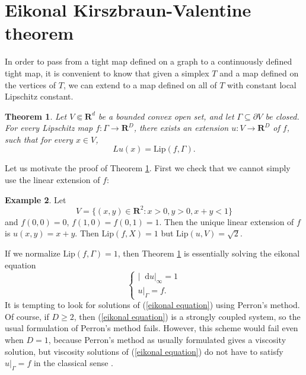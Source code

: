 \documentclass[reqno,11pt]{amsart}
\newcommand{\RR}{\mathbf{R}}
\newcommand*\dif{\mathop{}\!\mathrm{d}}
\DeclareMathOperator{\dist}{dist}
\newcommand{\Lip}{\mathrm{Lip}}
\newtheorem{theorem}{Theorem}[section]
\theoremstyle{definition}
\newtheorem{example}[theorem]{Example}
\numberwithin{equation}{section}
\newcommand\todo[1]{\textcolor{red}{TODO: #1}}
\begin{document}



\section{Eikonal Kirszbraun-Valentine theorem}
In order to pass from a tight map defined on a graph to a continuously defined tight map, it is convenient to know that given a simplex $T$ and a map defined on the vertices of $T$, we can extend to a map defined on all of $T$ with constant local Lipschitz constant.

\begin{theorem}\label{eikonal extension}
Let $V \Subset \RR^d$ be a bounded convex open set, and let $\Gamma \subseteq \partial V$ be closed.
For every Lipschitz map $f: \Gamma \to \RR^D$, there exists an extension $u: V \to \RR^D$ of $f$, such that for every $x \in V$,
$$Lu(x) = \Lip(f, \Gamma).$$
\end{theorem}

Let us motivate the proof of Theorem \ref{eikonal extension}.
First we check that we cannot simply use the linear extension of $f$:

\begin{example}
Let
$$V = \{(x, y) \in \RR^2: x > 0, y > 0, x + y < 1\}$$
and $f(0, 0) = 0$, $f(1, 0) = f(0, 1) = 1$.
Then the unique linear extension of $f$ is $u(x, y) = x + y$.
Then $\Lip(f, X) = 1$ but $\Lip(u, V) = \sqrt 2$.
\end{example}

If we normalize $\Lip(f, \Gamma) = 1$, then Theorem \ref{eikonal extension} is essentially solving the eikonal equation
\begin{equation}\label{eikonal equation}
\begin{cases}
|\dif u|_\infty = 1 \\
u|_\Gamma = f.
\end{cases}
\end{equation}
It is tempting to look for solutions of (\ref{eikonal equation}) using Perron's method.
Of course, if $D \geq 2$, then (\ref{eikonal equation}) is a strongly coupled system, so the usual formulation of Perron's method \cite{Ishii92} fails.
However, this scheme would fail even when $D = 1$, because Perron's method as usually formulated gives a viscosity solution, but viscosity solutions of (\ref{eikonal equation}) do not have to satisfy $u|_\Gamma = f$ in the classical sense \cite[\S7.C]{Crandall92}.
\end{document}
